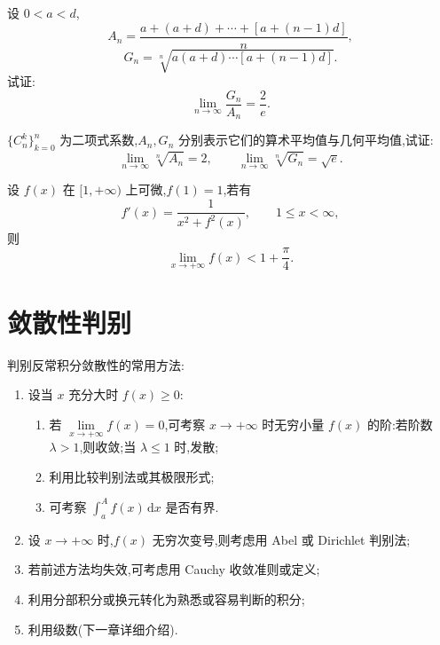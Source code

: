 \documentclass[../数学分析培优讲义.tex]{subfiles}
\begin{document}
\begin{example}
设 $0<a<d$,
\[
    A_n=\dfrac{a+(a+d)+\cdots+[a+(n-1)d]}{n},
\]
\[
    G_n=\sqrt[n]{a(a+d)\cdots[a+(n-1)d]}.
\]
试证:
\[
    \lim\limits_{n\to\infty}\dfrac{G_n}{A_n}=\dfrac{2}{e}.
\]
\end{example}
\exampleblank

\begin{example}
$\{C_{n}^{k}\}_{k=0}^n$ 为二项式系数,$A_n,G_n$ 分别表示它们的算术平均值与几何平均值,试证:
\[
    \lim\limits_{n\to\infty}\sqrt[n]{A_n}=2,
    \qquad
    \lim\limits_{n\to\infty}\sqrt[n]{G_n}=\sqrt{e}.
\]
\end{example}
\exampleblank

\begin{example}
设 $f(x)$ 在 $\lbrack 1,+\infty)$ 上可微,$f(1)=1$,若有
\[
    f'(x)=\dfrac{1}{x^2+f^2(x)},
    \qquad 1\leq x<\infty,
\]
则
\[
    \lim\limits_{x\to+\infty}f(x)<1+\dfrac{\pi}{4}.
\]
\end{example}
\exampleblank


\newpage

\section{敛散性判别}

\begin{remark}
判别反常积分敛散性的常用方法:
\begin{enumerate}[label=(\arabic*)]
    \item 设当 $x$ 充分大时 $f(x)\geq0$:
    \begin{enumerate}[label=\textcircled{\arabic*}]
        \item 若 $\displaystyle\lim\limits_{x\to+\infty}f(x)=0$,可考察 $x\to+\infty$ 时无穷小量 $f(x)$ 的阶:若阶数 $\lambda>1$,则收敛;当 $\lambda\leq1$ 时,发散;
        \item 利用比较判别法或其极限形式;
        \item 可考察 $\displaystyle\int_a^Af(x)\,\mathrm{d}x$ 是否有界.
    \end{enumerate}
    \item 设 $x\to+\infty$ 时,$f(x)$ 无穷次变号,则考虑用 Abel 或 Dirichlet 判别法;
    \item 若前述方法均失效,可考虑用 Cauchy 收敛准则或定义;
    \item 利用分部积分或换元转化为熟悉或容易判断的积分;
    \item 利用级数(下一章详细介绍).
\end{enumerate}
\end{remark}
\end{document}
